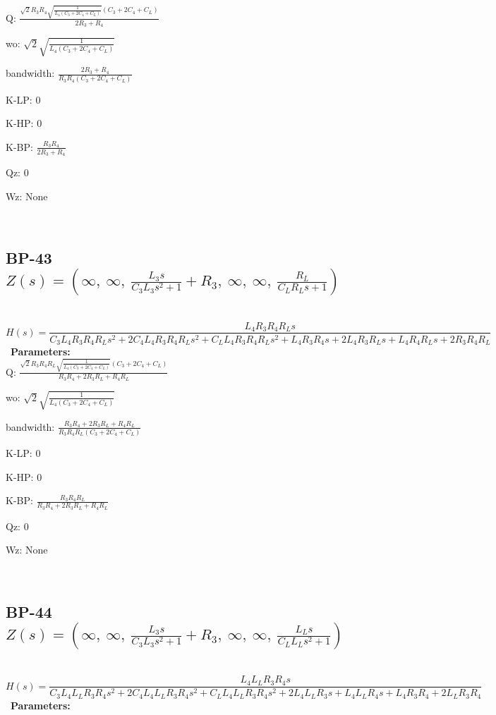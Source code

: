 \documentclass{article}
\begin{document}
Q: $\frac{\sqrt{2} R_{3} R_{4} \sqrt{\frac{1}{L_{4} \left(C_{3} + 2 C_{4} + C_{L}\right)}} \left(C_{3} + 2 C_{4} + C_{L}\right)}{2 R_{3} + R_{4}}$\ 

wo: $\sqrt{2} \sqrt{\frac{1}{L_{4} \left(C_{3} + 2 C_{4} + C_{L}\right)}}$\ 

bandwidth: $\frac{2 R_{3} + R_{4}}{R_{3} R_{4} \left(C_{3} + 2 C_{4} + C_{L}\right)}$\ 

K-LP: $0$\ 

K-HP: $0$\ 

K-BP: $\frac{R_{3} R_{4}}{2 R_{3} + R_{4}}$\ 

Qz: $0$\ 

Wz: $\text{None}$\ 

\ 

\subsection{BP-43 $Z(s) = \left( \infty, \  \infty, \  \frac{L_{3} s}{C_{3} L_{3} s^{2} + 1} + R_{3}, \  \infty, \  \infty, \  \frac{R_{L}}{C_{L} R_{L} s + 1}\right)$ } \ 
\textbf{\[H(s) = \frac{L_{4} R_{3} R_{4} R_{L} s}{C_{3} L_{4} R_{3} R_{4} R_{L} s^{2} + 2 C_{4} L_{4} R_{3} R_{4} R_{L} s^{2} + C_{L} L_{4} R_{3} R_{4} R_{L} s^{2} + L_{4} R_{3} R_{4} s + 2 L_{4} R_{3} R_{L} s + L_{4} R_{4} R_{L} s + 2 R_{3} R_{4} R_{L}}\] } \ 
\textbf{Parameters:}\\ 

Q: $\frac{\sqrt{2} R_{3} R_{4} R_{L} \sqrt{\frac{1}{L_{4} \left(C_{3} + 2 C_{4} + C_{L}\right)}} \left(C_{3} + 2 C_{4} + C_{L}\right)}{R_{3} R_{4} + 2 R_{3} R_{L} + R_{4} R_{L}}$\ 

wo: $\sqrt{2} \sqrt{\frac{1}{L_{4} \left(C_{3} + 2 C_{4} + C_{L}\right)}}$\ 

bandwidth: $\frac{R_{3} R_{4} + 2 R_{3} R_{L} + R_{4} R_{L}}{R_{3} R_{4} R_{L} \left(C_{3} + 2 C_{4} + C_{L}\right)}$\ 

K-LP: $0$\ 

K-HP: $0$\ 

K-BP: $\frac{R_{3} R_{4} R_{L}}{R_{3} R_{4} + 2 R_{3} R_{L} + R_{4} R_{L}}$\ 

Qz: $0$\ 

Wz: $\text{None}$\ 

\ 

\subsection{BP-44 $Z(s) = \left( \infty, \  \infty, \  \frac{L_{3} s}{C_{3} L_{3} s^{2} + 1} + R_{3}, \  \infty, \  \infty, \  \frac{L_{L} s}{C_{L} L_{L} s^{2} + 1}\right)$ } \ 
\textbf{\[H(s) = \frac{L_{4} L_{L} R_{3} R_{4} s}{C_{3} L_{4} L_{L} R_{3} R_{4} s^{2} + 2 C_{4} L_{4} L_{L} R_{3} R_{4} s^{2} + C_{L} L_{4} L_{L} R_{3} R_{4} s^{2} + 2 L_{4} L_{L} R_{3} s + L_{4} L_{L} R_{4} s + L_{4} R_{3} R_{4} + 2 L_{L} R_{3} R_{4}}\] } \ 
\textbf{Parameters:}\\ 
\end{document}
